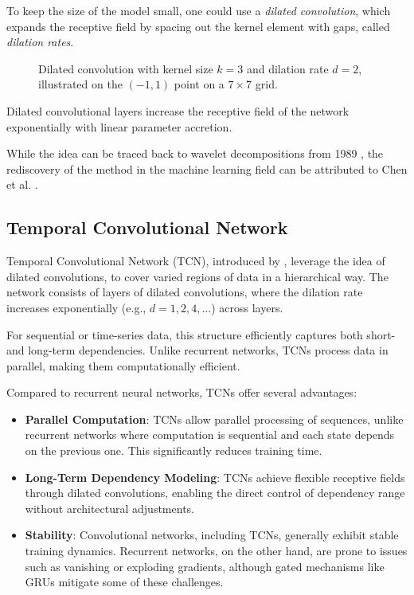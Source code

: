 To keep the size of the model small, one could use a \emph{dilated convolution}, which expands the receptive field by spacing out the kernel element with gaps, called \emph{dilation rates}.

\begin{figure}[ht!]
\centering

\caption[Dilated convolution.]{Dilated convolution with kernel size $k = 3$ and dilation rate $d = 2$, illustrated on the $(-1, 1)$ point on a $7 \times 7$ grid.}
\end{figure}

Dilated convolutional layers increase the receptive field of the network exponentially with linear parameter accretion. 

While the idea can be traced back to wavelet decompositions from 1989 \cite{Holschneider1989}, the rediscovery of the method in the machine learning field can be attributed to Chen et al. \cite{Chen2015}.

\subsection{Temporal Convolutional Network}

Temporal Convolutional Network (TCN), introduced by \cite{Colin2016}, leverage the idea of dilated convolutions, to cover varied regions of data in a hierarchical way. The network consists of layers of dilated convolutions, where the dilation rate increases exponentially (e.g., $d = 1, 2, 4, \dots$) across layers.

For sequential or time-series data, this structure efficiently captures both short- and long-term dependencies. Unlike recurrent networks, TCNs process data in parallel, making them computationally efficient.

Compared to recurrent neural networks, TCNs offer several advantages:
\begin{itemize}
	\item \textbf{Parallel Computation}: TCNs allow parallel processing of sequences, unlike recurrent networks where computation is sequential and each state depends on the previous one. This significantly reduces training time.
	\item \textbf{Long-Term Dependency Modeling}: TCNs achieve flexible receptive fields through dilated convolutions, enabling the direct control of dependency range without architectural adjustments.
	\item \textbf{Stability}: Convolutional networks, including TCNs, generally exhibit stable training dynamics. Recurrent networks, on the other hand, are prone to issues such as vanishing or exploding gradients, although gated mechanisms like GRUs mitigate some of these challenges. \end{itemize}

